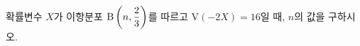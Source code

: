 확률변수 $X$가 이항분포 $\mathrm{B}\left(n{,}\mkern3mu\mathopen{}\dfrac{2}{3}\right)$를 따르고 $\mathrm{V}(-2X)=16$일 때, $n$의 값을 구하시오.
